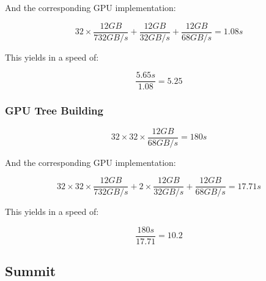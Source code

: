 \documentclass[]{article}
\begin{document}
And the corresponding GPU implementation:
\begin{center}
	\begin{equation}
		32 \times \frac{12 GB}{732 GB/s} + \frac{12 GB}{32 GB/s}  + \frac{12 GB}{68 GB/s} = 1.08s
	\end{equation}
\end{center}



This yields in a speed of:
\begin{center}
	\begin{equation}
		\frac{5.65s}{1.08} = 5.25
	\end{equation}
\end{center}


\subsubsection{GPU Tree Building}

\begin{center}
	\begin{equation}
		32 \times 32 \times \frac{ 12 GB }{68 GB/s} = 180s
	\end{equation}
\end{center}

And the corresponding GPU implementation:
\begin{center}
	\begin{equation}
		32 \times 32 \times \frac{12 GB}{732 GB/s} + 2 \times \frac{12 GB}{32 GB/s}  + \frac{12 GB}{68 GB/s} = 17.71s
	\end{equation}
\end{center}

This yields in a speed of:
\begin{center}
	\begin{equation}
		\frac{180s}{17.71} = 10.2
	\end{equation}
\end{center}

\vspace{5mm}


\subsection{Summit}
\end{document}
